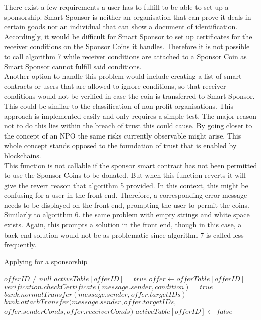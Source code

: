 There exist a few requirements a user has to fulfill to be able to set up a sponsorship. Smart Sponsor is neither an organisation that can prove it deals in certain goods nor an individual that can show a document of identification. Accordingly, it would be difficult for Smart Sponsor to set up certificates for the receiver conditions on the Sponsor Coins it handles. Therefore it is not possible to call algorithm 7 while receiver conditions are attached to a Sponsor Coin as Smart Sponsor cannot fulfill said conditions.\\
Another option to handle this problem would include creating a list of smart contracts or users that are allowed to ignore conditions, so that receiver conditions would not be verified in case the coin is transferred to Smart Sponsor. This could be similar to the classification of non-profit organisations. This approach is implemented easily and only requires a simple test. The major reason not to do this lies within the breach of trust this could cause. By going closer to the concept of an NPO the same risks currently observable might arise. This whole concept stands opposed to the foundation of trust that is enabled by blockchains.\\
This function is not callable if the sponsor smart contract has not been permitted to use the Sponsor Coins to be donated. But when this function reverts it will give the revert reason that algorithm 5 provided. In this context, this might be confusing for a user in the front end. Therefore, a corresponding error message needs to be displayed on the front end, prompting the user to permit the coins.\\
Similarly to algorithm 6. the same problem with empty strings and white space exists. Again, this prompts a solution in the front end, though in this case, a back-end solution would not be as problematic since algorithm 7 is called less frequently.
\begin{algorithm}
\caption{Applying for a sponsorship}\label{alg:applyOffer}
\begin{algorithmic}
\Require $offerID \neq null$
\Require $activeTable[offerID] = true$
\State $offer \gets offerTable[offerID]$
\Ensure $verification.checkCertificate(message.sender,condition) = true$
\EndFor
{}\\
\hspace{30pt}$bank.normalTransfer(message.sender, offer.targetIDs)$
\Else\\
\hspace{30pt}$bank.attachTransfer(message.sender, offer.targetIDs,$\\
\hspace{130pt}$offer.senderConds, offer.receiverConds)$
\EndIf
\State $activeTable[offerID] \gets false$
\end{algorithmic}
\end{algorithm}
